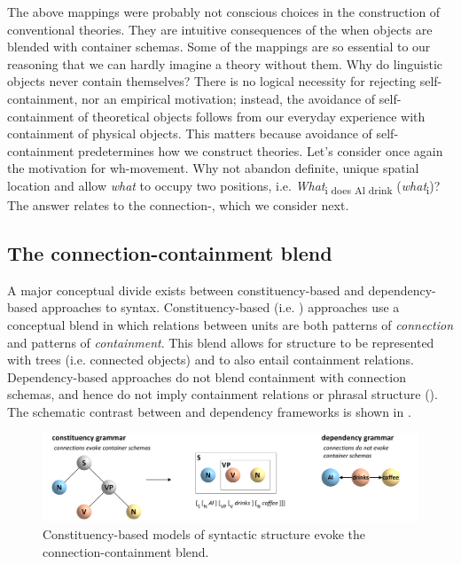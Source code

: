   The above mappings were probably not conscious choices in the construction of conventional theories. They are intuitive consequences of the  when objects are blended with container schemas. Some of the mappings are so essential to our reasoning that we can hardly imagine a theory without them. Why do linguistic objects never contain themselves? There is no logical necessity for rejecting self-containment, nor an empirical motivation; instead, the avoidance of self-containment of theoretical objects follows from our everyday experience with containment of physical objects. This matters because avoidance of self-containment predetermines how we construct theories. Let's consider once again the motivation for wh-movement. Why not abandon definite, unique spatial location and allow \textit{what} to occupy two positions, i.e. \textit{What}\textsubscript{i does Al drink} (\textit{what}\textsubscript{i})? The answer relates to the connection-, which we consider next.

\subsection{The connection-containment blend}

A major conceptual divide exists between constituency-based and dependency-based approaches to syntax. Constituency-based (i.e. ) approaches use a conceptual blend in which relations between units are both patterns of \textit{connection} and patterns of \textit{containment}. This blend allows for structure to be represented with trees (i.e. connected objects) and to also entail containment relations. Dependency-based approaches do not blend containment with connection schemas, and hence do not imply containment relations or phrasal structure (\citealt{Hays1964,Melʹčuk1988,Osborne2006,OsborneEtAl2011,Percival1990,Tesnière2018}). The schematic contrast between  and dependency frameworks is shown in {}. 

  
\begin{figure}
\includegraphics[width=\textwidth]{figures/Tilsen-img34.png}
\caption{Constituency-based models of syntactic structure evoke the connection-containment blend.}
\label{fig:3:6}
\end{figure}
 


